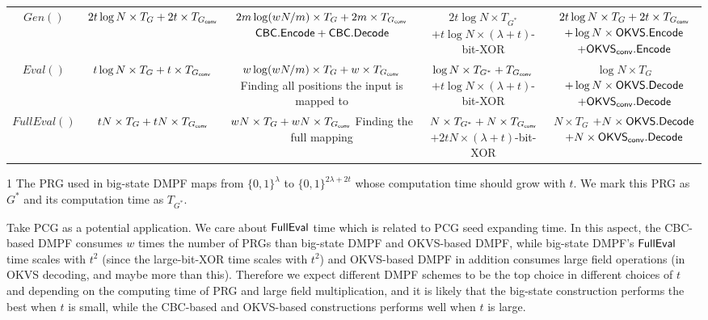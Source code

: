 \begin{table*}
{\begin{threeparttable}
\begin{tabular}{ccccc}
				$Gen()$ & $2t\log N\times T_G+2t\times T_{G_{\sf conv}}$ &\makecell{$2m\log(wN/m)\times T_G+2m\times T_{G_{\sf conv}}$\\${\sf CBC}.{\sf Encode}+{\sf CBC}.{\sf Decode}$} &\makecell{$2t\log N\times T_{G^*}$\tnote{1}\\$+t\log N\times (\lambda+t)$-bit-XOR}
        & \makecell{$2t\log N\times T_G+2t\times T_{G_{\sf conv}}$\\$+\log N\times {\sf OKVS}.{\sf Encode}$\\$+ \OKVS_{\sf conv}.\Encode$} \\

        \cline{1-5}

				$Eval()$ & $t\log N\times T_G+t\times T_{G_{\sf conv}}$ &\makecell{$w\log(wN/m)\times T_G + w\times T_{G_{\sf conv}}$\\Finding all positions the input is mapped to} & \makecell{$\log N\times T_{G^*} + T_{G_{\sf conv}}$\\$+t\log N \times (\lambda+t)$-bit-XOR}&\makecell{$\log N\times T_G$ \\$+\log N\times{\sf OKVS}.{\sf Decode}$\\ $+\OKVS_{\sf conv}.\Decode$} \\

        \cline{1-5}

				$FullEval()$ & $tN\times T_G+tN\times T_{G_{\sf conv}}$ &\makecell{$wN\times T_G+ wN\times T_{G_{\sf conv}}$\\Finding the full mapping} & \makecell{$N\times T_{G^*} + N\times T_{G_{\sf conv}}$\\$+2tN\times (\lambda+t)$-bit-XOR }& \makecell{$N\times T_G$ \\ $+N\times{\sf OKVS}.{\sf Decode}$\\$+N\times {\sf OKVS}_{\sf conv}.{\sf Decode}$} \\
        \bottomrule
			\end{tabular}	
      \begin{tablenotes}
        \item [1] The PRG used in big-state DMPF maps from $\{0,1\}^\lambda$ to $\{0,1\}^{2\lambda+2t}$ whose computation time should grow with $t$. We mark this PRG as $G^*$ and its computation time as $T_{G^*}$. 
        \end{tablenotes}
    \end{threeparttable}
    }
	\end{table*}

Take PCG as a potential application. We care about ${\sf FullEval}$ time which is related to PCG seed expanding time. In this aspect, the CBC-based DMPF consumes $w$ times the number of PRGs than big-state DMPF and OKVS-based DMPF, while big-state DMPF's ${\sf FullEval}$ time scales with $t^2$ (since the large-bit-XOR time scales with $t^2$) and OKVS-based DMPF in addition consumes large field operations (in OKVS decoding, and maybe more than this). Therefore we expect different DMPF schemes to be the top choice in different choices of $t$ and depending on the computing time of PRG and large field multiplication, and it is likely that the big-state construction performs the best when $t$ is small, while the CBC-based and OKVS-based constructions performs well when $t$ is large. 

